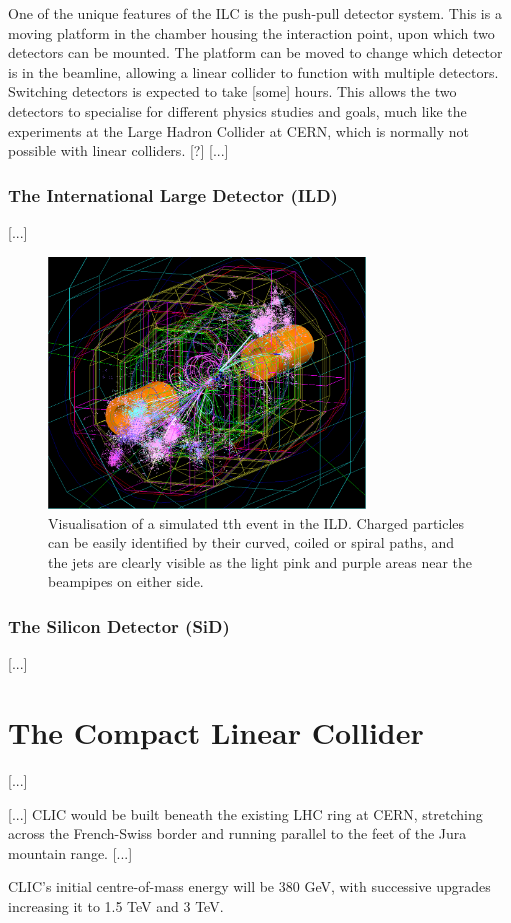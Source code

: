 One of the unique features of the ILC is the push-pull detector system. This is a moving platform in the chamber housing the interaction point, upon which two detectors can be mounted. The platform can be moved to change which detector is in the beamline, allowing a linear collider to function with multiple detectors. Switching detectors is expected to take [some] hours. This allows the two detectors to specialise for different physics studies and goals, much like the experiments at the Large Hadron Collider at CERN, which is normally not possible with linear colliders. [?] [...]

\subsubsection{The International Large Detector (ILD)}
[...]

\begin{figure}[h]
	\centering
	\includegraphics[width=0.75\textwidth]{../Pictures/SimulatedEvent1.png}
	\caption{Visualisation of a simulated tth event in the ILD. Charged particles can be easily identified by their curved, coiled or spiral paths, and the jets are clearly visible as the light pink and purple areas near the beampipes on either side.}
	\label{figure:colliders/ILD/tth-simulation}
\end{figure}

\subsubsection{The Silicon Detector (SiD)}
[...]

\section{The Compact Linear Collider}
[...]

[...] CLIC would be built beneath the existing LHC ring at CERN, stretching across the French-Swiss border and running parallel to the feet of the Jura mountain range. [...]


CLIC's initial centre-of-mass energy will be 380 GeV, with successive upgrades increasing it to 1.5 TeV and 3 TeV. 